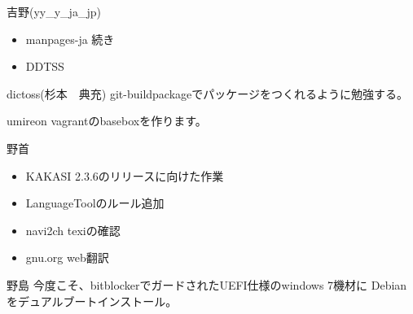 \begin{prework}{ 吉野(yy\_{}y\_{}ja\_{}jp) }
\begin{itemize}
\item manpages-ja 続き
\item DDTSS
\end{itemize}
\end{prework}

\begin{prework}{ dictoss(杉本　典充) }
 git-buildpackageでパッケージをつくれるように勉強する。
\end{prework}

\begin{prework}{ umireon }
 vagrantのbaseboxを作ります。
\end{prework}

\begin{prework}{ 野首 }
\begin{itemize}
\item KAKASI 2.3.6のリリースに向けた作業
\item LanguageToolのルール追加
\item navi2ch texiの確認
\item gnu.org web翻訳
\end{itemize}
\end{prework}

\begin{prework}{ 野島 }
 今度こそ、bitblockerでガードされたUEFI仕様のwindows 7機材に
Debianをデュアルブートインストール。
\end{prework}
